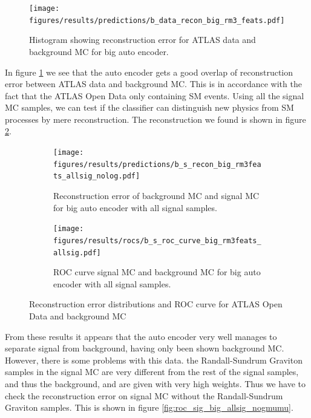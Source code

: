 \documentclass[ reprint, amsmath,amssymb, aps, nofootinbib]{revtex4-2}
\begin{document}
\begin{figure}[h]
     \centering
         \texttt{[image: figures/results/predictions/b\_data\_recon\_big\_rm3\_feats.pdf]}
         \caption{Histogram showing reconstruction error for ATLAS data and background MC for big auto encoder. }
     \label{fig:data_b_big_pred}
\end{figure}

In figure \ref{fig:data_b_big_pred} we see that the auto encoder gets a good overlap of reconstruction error between ATLAS data and background MC. This is in accordance with the fact that the ATLAS Open Data only containing SM events. Using all the signal MC samples, we can test if the classifier can distinguish new physics from SM processes by mere reconstruction. The reconstruction we found is shown in figure \ref{fig:s_b_big_pred_allsig}.

\begin{figure}[h]
     \centering
     \begin{subfigure}[b]{0.46\textwidth}
        \centering
    \texttt{[image: figures/results/predictions/b\_s\_recon\_big\_rm3feats\_allsig\_nolog.pdf]}
    \caption{Reconstruction error of background MC and signal MC for big auto encoder with all signal samples.  }
    \label{fig:s_b_big_pred_allsig}
     \end{subfigure}
     \hfill
     \begin{subfigure}[b]{0.46\textwidth}
         \centering
         \texttt{[image: figures/results/rocs/b\_s\_roc\_curve\_big\_rm3feats\_allsig.pdf]}
         \caption{ROC curve signal MC and background MC for big auto encoder with all signal samples.}
         \label{fig:s_b_big_roc_allsig}
     \end{subfigure}
     
        \caption{Reconstruction error distributions and ROC curve for ATLAS Open Data and background MC}
        \label{fig:roc_sig_big_allsig}
\end{figure}
From these results it appears that the auto encoder very well manages to separate signal from background, having only been shown background MC. However, there is some problems with this data. the Randall-Sundrum Graviton samples in the signal MC are very different from the rest of the signal samples, and thus the background, and are given with very high weights. Thus we have to check the reconstruction error on signal MC without the Randall-Sundrum Graviton samples. This is shown in figure \ref{fig:roc_sig_big_allsig_nogmumu}.
\end{document}
